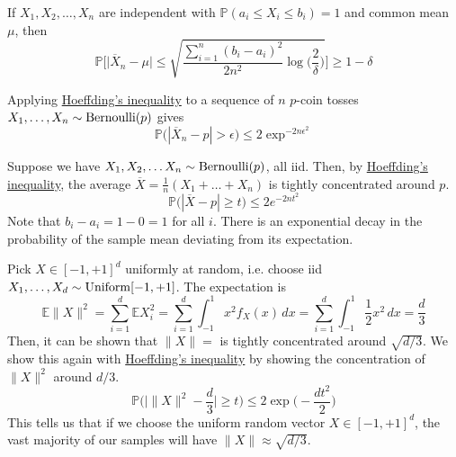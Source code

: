     \begin{corollary}
      \label{thm:independent-common-mean}
      If $X_1, X_2, \ldots, X_n$ are independent with $\mathbb{P}(a_i \leq X_i \leq b_i) = 1$ and common mean $\mu$, then 
      \begin{equation}
        \mathbb{P}\bigg[ \big| \overline{X}_n - \mu \big| \leq \sqrt{ \frac{\sum_{i=1}^n (b_i - a_i)^2}{2n^2} \log \Big(\frac{2}{\delta}\Big)} \bigg] \geq 1 - \delta
      \end{equation}
    \end{corollary}

    \begin{example}[Bernoulli]
      \label{ex:bernoulli-3}
      Applying \hyperref[thm:independent-common-mean]{Hoeffding's inequality} to a sequence of $n$ $p$-coin tosses $X_1, \ldots, X_n \sim \operatorname{Bernoulli}(p)$ gives 
      \begin{equation}
        \mathbb{P}\big( | \overline{X}_n - p | > \epsilon \big) \leq 2 \exp^{-2 n \epsilon^2}
      \end{equation}
    \end{example}

    \begin{example}[Mean]
      \label{ex:mean}
      Suppose we have $X_1, X_2, \ldots X_n \sim \operatorname{Bernoulli}(p)$, all iid. Then, by \hyperref[thm:independent-common-mean]{Hoeffding's inequality}, the average $\overline{X} = \frac{1}{n} (X_1 + \ldots + X_n)$ is tightly concentrated around $p$. 
      \begin{equation}
        \mathbb{P} \big( | \overline{X} - p | \geq t \big) \leq 2 e^{-2 n t^2}
      \end{equation}
      Note that $b_i - a_i = 1 - 0 = 1$ for all $i$. There is an exponential decay in the probability of the sample mean deviating from its expectation. 
    \end{example}

    \begin{example}[Hypercube]
      \label{ex:hypercube}
      Pick $X \in [-1, +1]^d$ uniformly at random, i.e. choose iid $X_1,\ldots, X_d \sim \operatorname{Uniform}[-1, +1]$. The expectation is 
      \begin{equation}
        \mathbb{E} \|X\|^2 = \sum_{i=1}^d \mathbb{E} X_i^2 = \sum_{i=1}^d \int_{-1}^1 x^2 f_X (x) \,dx = \sum_{i=1}^d \int_{-1}^1 \frac{1}{2} x^2 \,dx = \frac{d}{3}
      \end{equation}
      Then, it can be shown that $\|X\| = $ is tightly concentrated around $\sqrt{d/3}$. We show this again with \hyperref[thm:independent-common-mean]{Hoeffding's inequality} by showing the concentration of $\|X\|^2$ around $d/3$. 
      \begin{equation}
        \mathbb{P} \bigg( \bigg| \|X\|^2 - \frac{d}{3} \bigg| \geq t \bigg) \leq 2 \exp \Big( - \frac{ d t^2}{2} \Big)
      \end{equation}
      This tells us that if we choose the uniform random vector $X \in [-1, +1]^d$, the vast majority of our samples will have $\|X\| \approx \sqrt{d/3}$. 
    \end{example}


